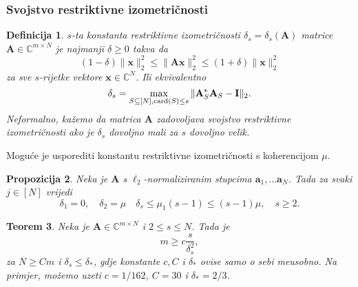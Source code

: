 \documentclass{beamer}
\newtheorem{thm}{Teorem}[section]
\newtheorem{defn}[thm]{Definicija}
\newtheorem{prop}[thm]{Propozicija}
\newcommand{\C}{\mathbb{C}}
\newcommand{\vect}[1]{\mathbf{#1}}
\renewcommand{\vec}{\vect}
\newcommand{\card}{\text{\normalfont{card}}}
\newcommand{\norm}[1]{\|{#1}\|}
\begin{document}
\begin{frame}
    \frametitle{Svojstvo restriktivne izometri\v{c}nosti}
\begin{defn}\label{defn:6:1}
    $s$-ta konstanta restriktivne izometri\v{c}nosti $\delta_s = \delta_s(\vec A)$ matrice $\vec A \in \C^{m \times N}$ je najmanji $\delta \geq 0$ takva da
    \begin{equation*}\label{6:1}
        (1-\delta) \norm{\vec x}_2^2 \leq \norm{\vec{Ax}}_2^2 \leq (1+\delta)\norm{\vec x}_2^2 
    \end{equation*}
    za sve $s$-rijetke vektore $\vec x \in \C^N$. Ili ekvivalentno
    \begin{equation*}\label{6:2}
        \delta_s = \max_{S \subseteq [N], \card(S) \leq s} \norm{\vec A^*_S \vec A_S - \vec I}_2.
    \end{equation*}
    Neformalno, ka\v{z}emo da matrica $\vec A$ zadovoljava svojstvo restriktivne izometri\v{c}nosti ako je $\delta_s$ dovoljno mali za $s$ dovoljno velik.
\end{defn}
    
\end{frame}

\begin{frame}
Mogu\'ce je usporediti konstantu restriktivne izometri\v{c}nosti s koherencijom $\mu$.
\begin{prop}\label{prop:6:2}
    Neka je $\vec A$ s $\ell_2$-normaliziranim stupcima $\vec a_1, \dots \vec a_N$. Tada za svaki $j \in [N]$ vrijedi
    \begin{equation*}
        \delta_1 = 0, \quad \delta_2 = \mu \quad \delta_s \leq \mu_1(s-1) \leq (s-1)\mu, \quad s \geq 2. 
    \end{equation*}
\end{prop}
\begin{thm}
    Neka je $\vec A \in \C^{m \times N}$ i $2 \leq s \leq N$. Tada je
    \begin{equation}\label{6:9}
        m \geq c \frac{s}{\delta_s^2} , 
    \end{equation}
    za $N \geq Cm$ i $\delta_s \leq \delta_*$, gdje konstante $c, C$ i $\delta_*$ ovise samo o sebi me\dj usobno. Na primjer, mo\v{z}emo uzeti $c = 1/162$, $C = 30$ i $\delta_* = 2/3$.
\end{thm}
\end{frame}
\end{document}
